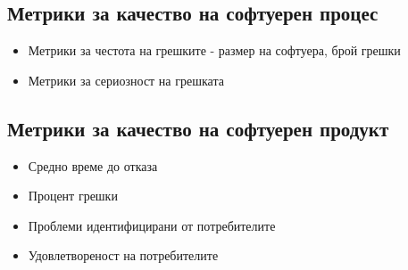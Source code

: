 \documentclass[fleqn,12pt]{article}
\begin{document}
\begin{flushleft}
\subsection{Метрики за качество на софтуерен процес}
    \begin{itemize}
        \item Метрики за честота на грешките - размер на софтуера, брой грешки 
        \item Метрики за сериозност на грешката
    \end{itemize}

\subsection{Метрики за качество на софтуерен продукт}
    \begin{itemize}
        \item Средно време до отказа
        \item Процент грешки
        \item Проблеми идентифицирани от потребителите
        \item Удовлетвореност на потребителите
    \end{itemize}

\end{flushleft}
\end{document}
